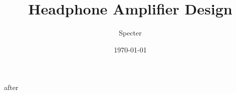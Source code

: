\documentclass[12pt,a4paper]{report}
\title{  Headphone Amplifier Design	 }
\author{Specter}
\date{\today}
\begin{document}

\listoftables
\listoffigures

after
	
	
\end{document}
